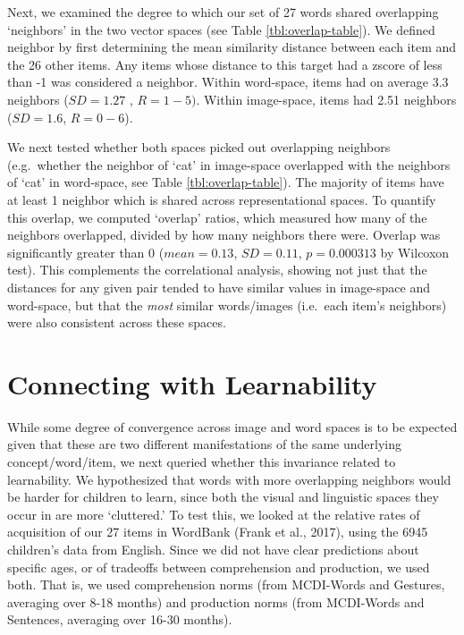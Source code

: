 \documentclass[10pt, letterpaper]{article}
\begin{document}
Next, we examined the degree to which our set of 27 words shared
overlapping `neighbors' in the two vector spaces (see Table
\ref{tbl:overlap-table}). We defined neighbor by first determining the
mean similarity distance between each item and the 26 other items. Any
items whose distance to this target had a zscore of less than -1 was
considered a neighbor. Within word-space, items had on average 3.3
neighbors (\(SD=1.27\) , \(R=1-5)\). Within image-space, items had 2.51
neighbors (\(SD=1.6\), \(R=0-6\)).

We next tested whether both spaces picked out overlapping neighbors
(e.g.~whether the neighbor of `cat' in image-space overlapped with the
neighbors of `cat' in word-space, see Table \ref{tbl:overlap-table}).
The majority of items have at least 1 neighbor which is shared across
representational spaces. To quantify this overlap, we computed `overlap'
ratios, which measured how many of the neighbors overlapped, divided by
how many neighbors there were. Overlap was significantly greater than 0
(\(mean=0.13\), \(SD=0.11\), \(p=0.000313\) by Wilcoxon test). This
complements the correlational analysis, showing not just that the
distances for any given pair tended to have similar values in
image-space and word-space, but that the \emph{most} similar
words/images (i.e.~each item's neighbors) were also consistent across
these spaces.

\section{Connecting with
Learnability}\label{connecting-with-learnability}

While some degree of convergence across image and word spaces is to be
expected given that these are two different manifestations of the same
underlying concept/word/item, we next queried whether this invariance
related to learnability. We hypothesized that words with more
overlapping neighbors would be harder for children to learn, since both
the visual and linguistic spaces they occur in are more `cluttered.' To
test this, we looked at the relative rates of acquisition of our 27
items in WordBank (Frank et al., 2017), using the 6945 children's data
from English. Since we did not have clear predictions about specific
ages, or of tradeoffs between comprehension and production, we used
both. That is, we used comprehension norms (from MCDI-Words and
Gestures, averaging over 8-18 months) and production norms (from
MCDI-Words and Sentences, averaging over 16-30 months).
\end{document}
